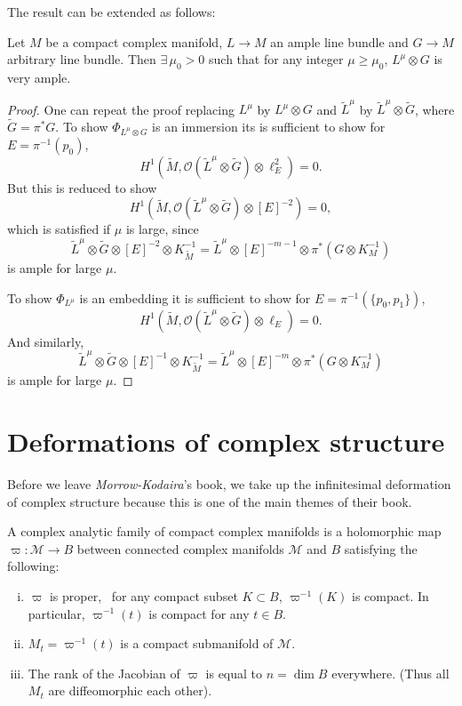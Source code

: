 \documentclass[12pt]{article}
\begin{document}
The result can be extended as follows:
\begin{theorem}
  Let \(M\) be a compact complex manifold, \(L\to M\) an ample line bundle and
  \(G\to M\) arbitrary line bundle. Then \(\exists\,\mu_0>0\) such that for any
  integer \(\mu\ge \mu_0\), \(L^\mu\otimes G\) is very ample.
\end{theorem}
\begin{proof}
  One can repeat the proof replacing \(L^\mu\) by \(L^\mu\otimes G\) and
  \(\tilde{L}^\mu\) by \(\tilde{L}^\mu\otimes \tilde{G}\), where \(\tilde{G}
  =\pi^*G\). To show \(\Phi_{L^\mu\otimes G}\) is an immersion its is sufficient
  to show for \(E=\pi^{-1}(p_0)\), \[
    H^1(\tilde{M},\mathcal{O}(\tilde{L}^\mu\otimes\tilde{G})\otimes\ell_E^2)=0
  .\] But this is reduced to show \[
  H^1(\tilde{M},\mathcal{O}(\tilde{L}^\mu\otimes \tilde{G})\otimes [E]^{-2})=0
  ,\] which is satisfied if \(\mu\) is large, since \[
    \tilde{L}^{\mu}\otimes\tilde{G}\otimes [E]^{-2}\otimes K_{\tilde{M}}^{-1}
    =\tilde{L}^\mu\otimes[E]^{-m-1}\otimes \pi^*(G\otimes K_M^{-1})
  \] is ample for large \(\mu\).

  To show \(\Phi_{L^\mu}\) is an embedding it is sufficient to show for
  \(E=\pi^{-1}(\{p_0,p_1\})\), \[
    H^1(\tilde{M},\mathcal{O}(\tilde{L}^\mu\otimes \tilde{G})\otimes \ell_E)=0
  .\] And similarly, \[
    \tilde{L}^{\mu}\otimes\tilde{G}\otimes [E]^{-1}\otimes K_{\tilde{M}}^{-1}
    =\tilde{L}^\mu\otimes[E]^{-m}\otimes \pi^*(G\otimes K_M^{-1})
  \] is ample for large \(\mu\).
\end{proof}

\section{Deformations of complex structure}
Before we leave \emph{Morrow-Kodaira}'s book, we take up the infinitesimal
deformation of complex structure because this is one of the main themes
of their book.
\begin{definition}
  A complex analytic family of compact complex manifolds is a holomorphic
  map \(\varpi\colon\mathscr{M}\to B\) between connected complex
  manifolds \(\mathscr{M}\) and \(B\) satisfying the following:
  \begin{enumerate}[i)]
  \item \(\varpi\) is proper, \ie\ for any compact subset \(K\subset B\),
    \(\varpi^{-1}(K)\) is compact. In particular, \(\varpi^{-1}(t)\) is compact
    for any \(t\in B\).
  \item \(M_t=\varpi^{-1}(t)\) is a compact submanifold of \(\mathscr{M}\).
  \item The rank of the Jacobian of \(\varpi\) is equal to \(n=\dim B\)
    everywhere. (Thus all \(M_t\) are diffeomorphic each other).
  \end{enumerate}
\end{definition}
\end{document}
